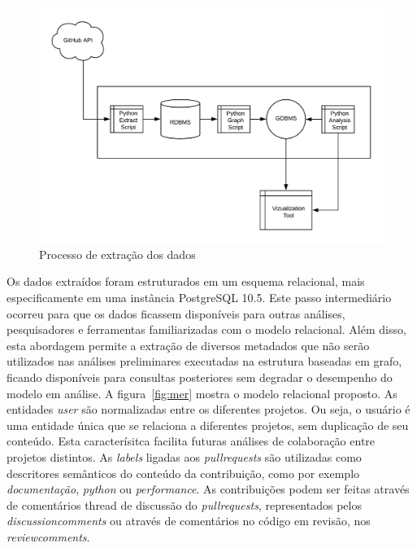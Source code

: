 \documentclass[sigconf]{acmart}
\begin{document}
\begin{figure}[!htbp]
 \includegraphics[width=\columnwidth]{processo_extracao}
 \caption{Processo de extração dos dados}\label{fig:processo_extracao}
\end{figure}

Os dados extraídos foram estruturados em um esquema relacional, mais especificamente em uma instância PostgreSQL 10.5. Este passo intermediário ocorreu para que os dados ficassem disponíveis para outras análises, pesquisadores e ferramentas familiarizadas com o modelo relacional. Além disso, esta abordagem permite a extração de diversos metadados que não serão utilizados nas análises preliminares executadas na estrutura baseadas em grafo, ficando disponíveis para consultas posteriores sem degradar o desempenho do modelo em análise. A figura~\ref{fig:mer} mostra o modelo relacional proposto. As entidades \textit{user} são normalizadas entre os diferentes projetos. Ou seja, o usuário é uma entidade única que se relaciona a diferentes projetos, sem duplicação de seu conteúdo. Esta caracterísitca facilita futuras análises de colaboração entre projetos distintos. As \textit{labels} ligadas aos \textit{pullrequests} são utilizadas como descritores semânticos do conteúdo da contribuição, como por exemplo \textit{documentação}, \textit{python} ou \textit{performance}. As contribuições podem ser feitas através de comentários thread de discussão do \textit{pullrequests}, representados pelos \textit{discussioncomments} ou através de comentários no código em revisão, nos \textit{reviewcomments}.
\end{document}
